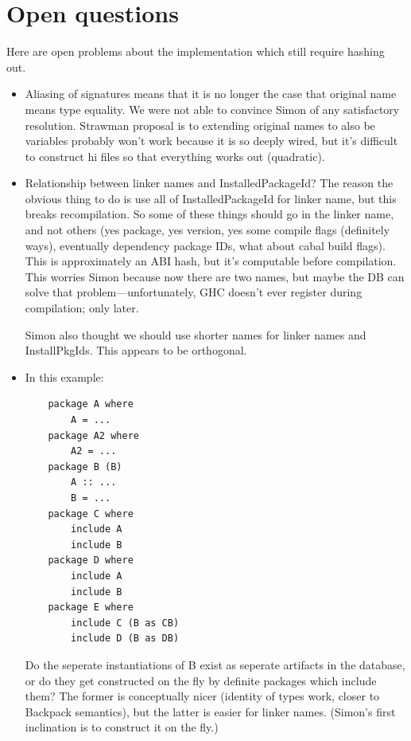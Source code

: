 \documentclass{article}
\begin{document}
\section{Open questions}\label{sec:open-questions}

Here are open problems about the implementation which still require
hashing out.

\begin{itemize}
    \item Aliasing of signatures means that it is no longer the case that
      original name means type equality.  We were not able to convince
      Simon of any satisfactory resolution.  Strawman proposal is to
      extending original names to also be variables probably won't work
      because it is so deeply wired, but it's difficult to construct hi
      files so that everything works out (quadratic).

  \item Relationship between linker names and InstalledPackageId? The reason
      the obvious thing to do is use all of InstalledPackageId for linker
      name, but this breaks recompilation.  So some of these things
      should go in the linker name, and not others (yes package, yes
      version, yes some compile flags (definitely ways), eventually
      dependency package IDs, what about cabal build flags).  This is
      approximately an ABI hash, but it's computable before compilation.
      This worries Simon because now there are two names, but maybe
      the DB can solve that problem---unfortunately, GHC doesn't ever
      register during compilation; only later.

        Simon also thought we should use shorter names for linker
        names and InstallPkgIds.  This appears to be orthogonal.

    \item In this example:

\begin{verbatim}
    package A where
        A = ...
    package A2 where
        A2 = ...
    package B (B)
        A :: ...
        B = ...
    package C where
        include A
        include B
    package D where
        include A
        include B
    package E where
        include C (B as CB)
        include D (B as DB)
\end{verbatim}

      Do the seperate instantiations of B exist as seperate artifacts
      in the database, or do they get constructed on the fly by
      definite packages which include them?  The former is conceptually
      nicer (identity of types work, closer to Backpack semantics), but
      the latter is easier for linker names. (Simon's first inclination
      is to construct it on the fly.)


\end{itemize}
\end{document}
